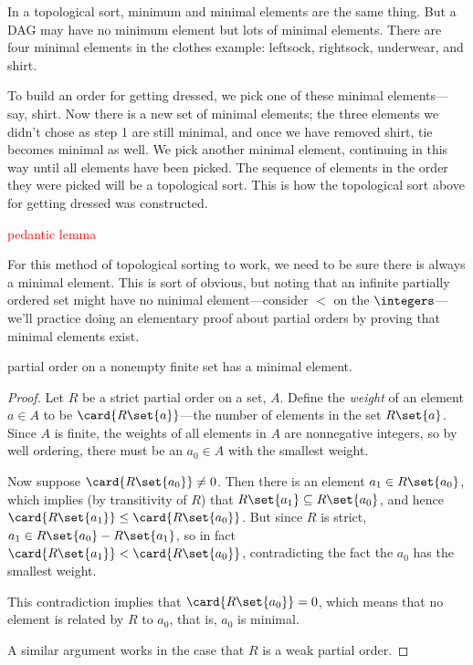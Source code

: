 In a topological sort, minimum and minimal elements are the same thing.
But a DAG may have no minimum element but lots of minimal
elements.  There are four minimal elements in the clothes example:
leftsock, rightsock, underwear, and shirt.

To build an order for getting dressed, we pick one of these minimal
elements---say, shirt.  Now there is a new set of minimal elements;
the three elements we didn't chose as step 1 are still minimal, and once
we have removed shirt, tie becomes minimal as well.  We pick
another minimal element, continuing in this way until all elements
have been picked.  The sequence of elements in the order they were
picked will be a topological sort.  This is how the topological sort
above for getting dressed was constructed.

\begin{editingnotes}
\textcolor{red}{pedantic lemma}

For this method of topological sorting to work, we need to be sure
there is always a minimal element.  This is sort of obvious, but
noting that an infinite partially ordered set might have no minimal
element---consider $<$ on the $\integers$---we'll practice doing an
elementary proof about partial orders by proving that minimal elements
exist.

\begin{lemma}\label{finmin}
   partial order on a nonempty finite set
  has a minimal element.

\begin{proof} Let $R$ be a strict partial order on a set, $A$.  Define the \emph{weight}
of an element $a \in A$ to be $\card{R\set{a}}$---the number of
elements in the set $R\set{a}$.  Since $A$ is finite, the weights of
all elements in $A$ are nonnegative integers, so by well ordering,
there must be an $a_0 \in A$ with the smallest weight.

Now suppose $\card{R\set{a_0}} \neq 0$.  Then there is an element $a_1 \in
R\set{a_0}$, which implies (by transitivity of $R$) that $R\set{a_1}
\subseteq R\set{a_0}$, and hence $\card{R\set{a_1}} \leq
\card{R\set{a_0}}$.  But since $R$ is strict, $a_1 \in R\set{a_0} -
R\set{a_1}$, so in fact $\card{R\set{a_1}} < \card{R\set{a_0}}$,
contradicting the fact the $a_0$ has the smallest weight.

This contradiction implies that $\card{R\set{a_0}} = 0$, which means that
no element is related by $R$ to $a_0$, that is, $a_0$ is minimal.

A similar argument works in the case that $R$ is a weak partial order.

\end{proof}
\end{lemma}

\end{editingnotes}

